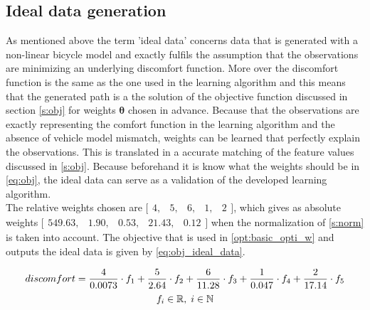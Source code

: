 \subsection{Ideal data generation} \label{s:GD}
As mentioned above the term 'ideal data' concerns data that is generated with a non-linear bicycle model and exactly fulfils the assumption that the observations are minimizing an underlying discomfort function. More over the discomfort function is the same as the one used in the learning algorithm and this means that the generated path is a the solution of the objective function discussed in section \ref{s:obj} for weights $\bm{\theta}$ chosen in advance. Because that the observations are exactly representing the comfort function in the learning algorithm and the absence of vehicle model mismatch, weights can be learned that perfectly explain the observations. This is translated in a accurate matching of the feature values discussed in \ref{s:obj}. Because beforehand it is know what the weights should be in \ref{eq:obj}, the ideal data can serve as a validation of the developed learning algorithm.\\

The relative weights chosen are $ \bigl[ \begin{smallmatrix} 4,&5,&6,&1,&2\end{smallmatrix}\bigr]$, which gives as absolute weights  $ \bigl[ \begin{smallmatrix} 549.63, &1.90, &0.53,  &21.43, &0.12\end{smallmatrix}\bigr]$ when the normalization of \ref{s:norm} is taken into account. The objective that is used in \ref{opt:basic_opti_w} and outputs the ideal data is given by \ref{eq:obj_ideal_data}.

\begin{equation}\label{eq:obj_ideal_data}
discomfort = \frac{4}{0.0073} \cdot f_1 +\frac{5}{2.64} \cdot f_2 +\frac{6}{11.28} \cdot f_3 +\frac{1}{0.047} \cdot f_4 +\frac{2}{17.14} \cdot f_5 \\
\end{equation}
\[	f_i \in \mathbb{R}, \hspace{1mm}
i \in \mathbb{N}\]\\

